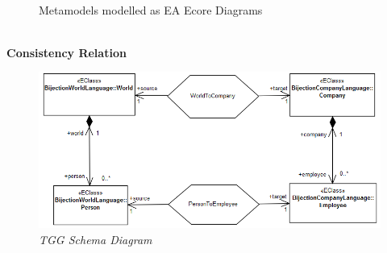 \documentclass{article}
\begin{document}
\begin{figure}[ht]
    \centering
    \mbox{\quad
          }
    \caption{Metamodels modelled as EA Ecore Diagrams}
    \label{fig:eMoIMP1}
\end{figure}

~\\
\textbf{Consistency Relation}

\begin{figure}[ht]
  \centering 
  \includegraphics[scale=0.4]{graphics/bij-schema.png}
  \caption{\textit{TGG Schema Diagram}}
  \label{fig:bij-schema}
\end{figure}
\end{document}
